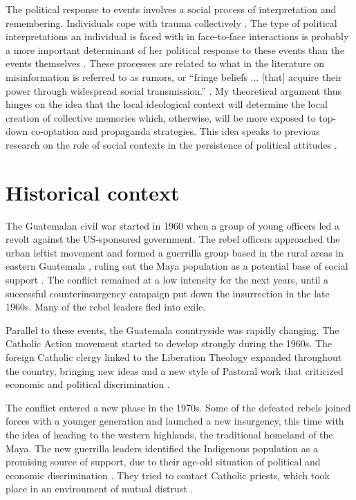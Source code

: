 \documentclass[12pt, notitlepage]{article}
\begin{document}
The political response to events involves a social process of interpretation and remembering.
Individuals cope with trauma collectively \citep{Lyons:1998aa}.
The type of political interpretations an individual is faced with in face-to-face interactions is probably a more important determinant of her political response to these events than the events themselves \citep{Dyrstad:2012aa, Molina:2014aa, Glaurdic:2016aa}.
These processes are related to what in the literature on misinformation is referred to as rumors, or ``fringe beliefs ... [that] acquire their power through widespread social transmission.'' \citep[243]{Berinsky:2017ty}.
My theoretical argument thus hinges on the idea that the local ideological context will determine the local creation of collective memories which, otherwise, will be more exposed to top-down co-optation and propaganda strategies.
This idea speaks to previous research on the role of social contexts in the persistence of political attitudes \citep{Wittenberg:2006aa, Tavits:2013aa}.

\section*{Historical context}

The Guatemalan civil war started in 1960 when a group of young officers led a revolt against the US-sponsored government.
The rebel officers approached the urban leftist movement and formed a guerrilla group based in the rural areas in eastern Guatemala \citep{Arias:1992aa}, ruling out the Maya population as a potential base of social support \citep{Smith:1990ab}.
The conflict remained at a low intensity for the next years, until a successful counterinsurgency campaign put down the insurrection in the late 1960s.
Many of the rebel leaders fled into exile.

Parallel to these events, the Guatemala countryside was rapidly changing.
The Catholic Action movement started to develop strongly during the 1960s.
The foreign Catholic clergy linked to the Liberation Theology expanded throughout the country, bringing new ideas and a new style of Pastoral work that criticized economic and political discrimination \citep{Arias:1992aa, Nelson:2009aa, Stoll:1999aa}.

The conflict entered a new phase in the 1970s.
Some of the defeated rebels joined forces with a younger generation and launched a new insurgency, this time with the idea of heading to the western highlands, the traditional homeland of the Maya.
The new guerrilla leaders identified the Indigenous population as a promising source of support, due to their age-old situation of political and economic discrimination \citep{Payeras:1981aa, Arias:1992aa}.
They tried to contact Catholic priests, which took place in an environment of mutual distrust \citep[e.g.][]{Manz:2004aa}.
\end{document}
